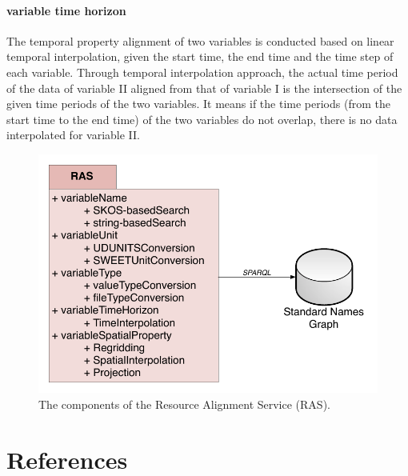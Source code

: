 \documentclass[review]{elsarticle}
\begin{document}
\paragraph{variable time horizon} The temporal property alignment of two variables is conducted based on linear temporal interpolation, given the start time, the end time and the time step of each variable. Through temporal interpolation approach, the actual time period of the data of variable II aligned from that of variable I is the intersection of the given time periods of the two variables. It means if the time periods (from the start time to the end time) of the two variables do not overlap, there is no data interpolated for variable II. 

\begin{figure}[!htbp]
\centering
\includegraphics[scale=0.7]{../figures/RASComponents} 
\caption{The components of the Resource Alignment Service (RAS).}
\label{RASComponents}
\end{figure}

\section*{References}


\end{document}
